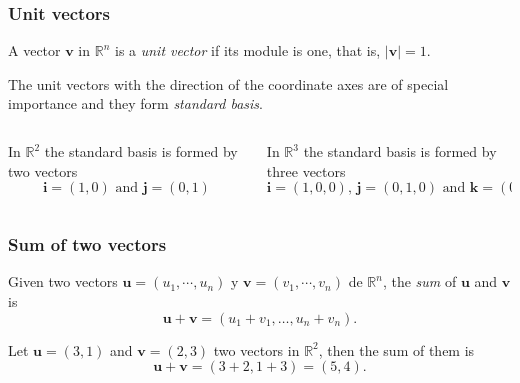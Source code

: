 \begin{frame}
\frametitle{Unit vectors}
\begin{definition}
A vector $\mathbf{v}$ in $\mathbb{R}^n$ is a \emph{unit vector} if its module is one, that is, $|\mathbf{v}|=1$.
\end{definition}

The unit vectors with the direction of the coordinate axes are of special importance and they form \emph{standard basis}.

\begin{columns}
\begin{column}{.48\textwidth}
In $\mathbb{R}^2$ the standard basis is formed by two vectors
\[
\mathbf{i}=(1,0)\mbox{ and }\mathbf{j}=(0,1)
\]
\begin{center}

\end{center}
\end{column}
\begin{column}{.48\textwidth}
In $\mathbb{R}^3$ the standard basis is formed by three vectors
\[
\mathbf{i}=(1,0,0)\mbox{, }\mathbf{j}=(0,1,0) \mbox{ and } \mathbf{k}=(0,0,1)
\]
\begin{center}

\end{center}
\end{column}
\end{columns}
\end{frame}


\begin{frame}
\frametitle{Sum of two vectors}
\begin{definition}
Given two vectors $\mathbf{u}=(u_1,\cdots,u_n)$ y $\mathbf{v}=(v_1,\cdots,v_n)$ de $\mathbb{R}^n$, the \emph{sum} of $\mathbf{u}$ and $\mathbf{v}$ is
\[
\mathbf{u}+\mathbf{v} = (u_1+v_1,\ldots, u_n+v_n).
\]
\end{definition}

Let $\mathbf{u}=(3,1)$ and $\mathbf{v}=(2,3)$ two vectors in $\mathbb{R}^2$, then the sum of them is 
\[
\mathbf{u}+\mathbf{v} = (3+2,1+3) = (5,4).
\]

\begin{center}

\end{center}
\end{frame}


